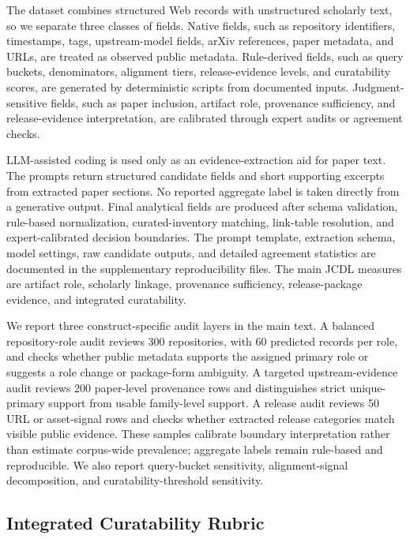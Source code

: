 The dataset combines structured Web records with unstructured scholarly text, so we separate three classes of fields. Native fields, such as repository identifiers, timestamps, tags, upstream-model fields, arXiv references, paper metadata, and URLs, are treated as observed public metadata. Rule-derived fields, such as query buckets, denominators, alignment tiers, release-evidence levels, and curatability scores, are generated by deterministic scripts from documented inputs. Judgment-sensitive fields, such as paper inclusion, artifact role, provenance sufficiency, and release-evidence interpretation, are calibrated through expert audits or agreement checks.

LLM-assisted coding is used only as an evidence-extraction aid for paper text. The prompts return structured candidate fields and short supporting excerpts from extracted paper sections. No reported aggregate label is taken directly from a generative output. Final analytical fields are produced after schema validation, rule-based normalization, curated-inventory matching, link-table resolution, and expert-calibrated decision boundaries. The prompt template, extraction schema, model settings, raw candidate outputs, and detailed agreement statistics are documented in the supplementary reproducibility files. The main JCDL measures are artifact role, scholarly linkage, provenance sufficiency, release-package evidence, and integrated curatability.

We report three construct-specific audit layers in the main text. A balanced repository-role audit reviews 300 repositories, with 60 predicted records per role, and checks whether public metadata supports the assigned primary role or suggests a role change or package-form ambiguity. A targeted upstream-evidence audit reviews 200 paper-level provenance rows and distinguishes strict unique-primary support from usable family-level support. A release audit reviews 50 URL or asset-signal rows and checks whether extracted release categories match visible public evidence. These samples calibrate boundary interpretation rather than estimate corpus-wide prevalence; aggregate labels remain rule-based and reproducible. We also report query-bucket sensitivity, alignment-signal decomposition, and curatability-threshold sensitivity.



\subsection{Integrated Curatability Rubric}

